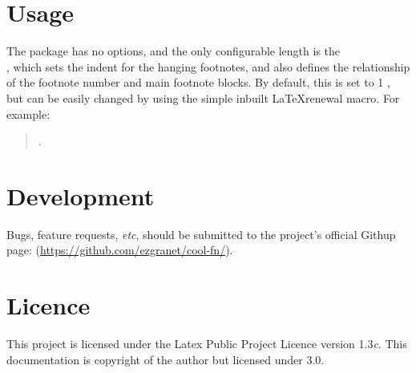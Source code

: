 \documentclass[12pt]{article}
\begin{document}
\section{Usage}
The package has no options, and the only configurable length is the \\\texttt{\fnindent}, which sets the indent for the hanging footnotes, and also defines the relationship of the footnote number and main footnote blocks.  By default, this is set to 1 , but can be easily changed by using the simple inbuilt \LaTeX renewal macro. For example:
\begin{quote}
 \texttt{\renewcommand{\fnindent}{1.25em}}.
\end{quote}
\section{Development}
Bugs, feature requests, \textit{etc}, should be submitted to the project's official Githup page: (\url{https://github.com/ezgranet/cool-fn/}).

\section{Licence}
	This project is licensed under the Latex Public Project Licence version 1.3\textit{c}. This documentation is copyright of the author but licensed under  3.0.

\clearpage
\end{document}
